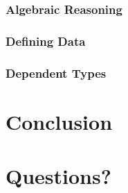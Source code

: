 \documentclass{beamer}
\begin{document}
\begin{frame}
  \frametitle{Algebraic Reasoning}

\end{frame}

\begin{frame}
  \frametitle{Defining Data}

\end{frame}

\begin{frame}
  \frametitle{Dependent Types}

\end{frame}

\section{Conclusion}

\section{Questions?}
\end{document}
